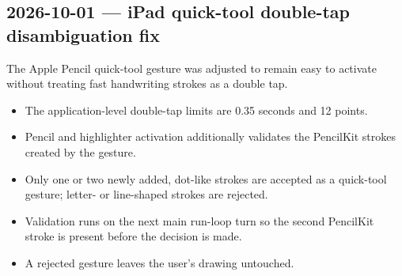 \documentclass[a4paper]{article}
\title{}
\date{}
\author{Mohammad Rahmani}
\begin{document}
   \maketitle

   \begin{preview}
      \section*{2026-10-01 --- iPad quick-tool double-tap disambiguation fix}

      The Apple Pencil quick-tool gesture was adjusted to remain easy to activate
      without treating fast handwriting strokes as a double tap.

      \begin{itemize}
         \item The application-level double-tap limits are 0.35 seconds and 12 points.
         \item Pencil and highlighter activation additionally validates the PencilKit
               strokes created by the gesture.
         \item Only one or two newly added, dot-like strokes are accepted as a
               quick-tool gesture; letter- or line-shaped strokes are rejected.
         \item Validation runs on the next main run-loop turn so the second PencilKit
               stroke is present before the decision is made.
         \item A rejected gesture leaves the user's drawing untouched.
      \end{itemize}
   \end{preview}

   
   
\end{document}
